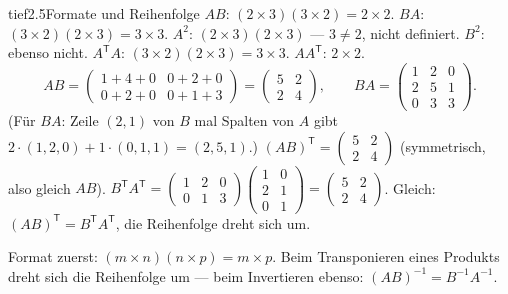 \begin{loesungkarte}{tief}{2.5}{Formate und Reihenfolge}
$AB$: $(2\times3)(3\times2) = 2\times2$. $BA$: $(3\times2)(2\times3) = 3\times3$. $A^{2}$: $(2\times3)(2\times3)$ --- $3\neq2$, nicht definiert. $B^{2}$: ebenso nicht. $A^{\mathsf T}A$: $(3\times2)(2\times3) = 3\times3$. $AA^{\mathsf T}$: $2\times2$.
\[ AB = \begin{pmatrix}1 + 4 + 0 & 0 + 2 + 0\\ 0 + 2 + 0 & 0 + 1 + 3\end{pmatrix} = \begin{pmatrix}5 & 2\\ 2 & 4\end{pmatrix},\qquad BA = \begin{pmatrix}1 & 2 & 0\\ 2 & 5 & 1\\ 0 & 3 & 3\end{pmatrix}. \]
(Für $BA$: Zeile $(2, 1)$ von $B$ mal Spalten von $A$ gibt $2\cdot(1, 2, 0) + 1\cdot(0, 1, 1) = (2, 5, 1)$.)
$(AB)^{\mathsf T} = \begin{pmatrix}5 & 2\\ 2 & 4\end{pmatrix}$ (symmetrisch, also gleich $AB$). $B^{\mathsf T}A^{\mathsf T} = \begin{pmatrix}1 & 2 & 0\\ 0 & 1 & 3\end{pmatrix}\begin{pmatrix}1 & 0\\ 2 & 1\\ 0 & 1\end{pmatrix} = \begin{pmatrix}5 & 2\\ 2 & 4\end{pmatrix}$. Gleich: $(AB)^{\mathsf T} = B^{\mathsf T}A^{\mathsf T}$, die Reihenfolge dreht sich um.
\begin{mitnehmen}\kastentext
Format zuerst: $(m\times n)(n\times p) = m\times p$. Beim Transponieren eines Produkts dreht sich die Reihenfolge um --- beim Invertieren ebenso: $(AB)^{-1} = B^{-1}A^{-1}$.
\end{mitnehmen}
\end{loesungkarte}

